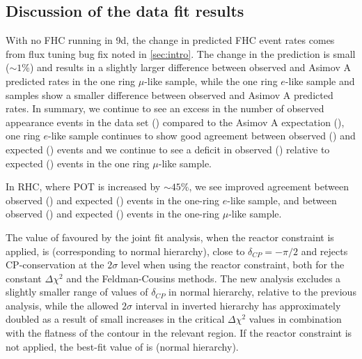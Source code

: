 \begin{table}[htb]
	\centering
	
	\caption{
		The confidence intervals at $1\sigma$, 90\%, $2\sigma$ and $3\sigma$ CL obtained with the Feldman-Cousins method for the \RunPeriod data set is shown for the measurement of \deltacp versus mass hierarchy.
	}
	\label{tab:fc_interval}
\end{table}

\FloatBarrier

\subsection {Discussion of the \RunPeriod data fit results}
\label{sec:results:discussion}

With no FHC running in 9d, the change in predicted FHC event rates comes from flux tuning bug fix noted in \ref{sec:intro}. The change in the prediction is small ($\sim1$\%) and results in a slightly larger difference between observed and Asimov A predicted rates in the one ring $\mu$-like sample, while the one ring $e$-like sample and \nueCConepi samples show a smaller difference between observed and Asimov A predicted rates. In summary, we continue to see an excess in the number of observed appearance events in the \nueCConepi data set (\NskObservedNueCConepi{})  compared to the Asimov A expectation (\NAsimovAExpectationNueCConepi{}), one ring $e$-like sample continues to show good agreement between observed (\NskObservedNue{}) and expected (\NAsimovAExpectationNue{}) events and we continue to see a deficit in observed (\NskObservedNumu{}) relative to expected (\NAsimovAExpectationNumu) events in the one ring $\mu$-like sample.

In RHC, where POT is increased by $\sim45$\%, we see improved agreement between observed (\NskObservedNueBar{}) and expected (\NAsimovAExpectationNueBar{}) events in the one-ring $e$-like sample, and between observed (\NskObservedNumuBar{}) and expected (\NAsimovAExpectationNumuBar) events in the one-ring $\mu$-like sample.

The value of \deltacp favoured by the joint fit analysis, when the reactor constraint is applied, is \BestFitDeltacpwRC (corresponding to normal hierarchy), close to $\delta_{CP} = -\pi / 2$ and rejects CP-conservation at the $2\sigma$ level when using the reactor constraint, both for the constant $\Delta\chi^2$ and the Feldman-Cousins methods. The new analysis excludes a slightly smaller range of values of $\delta_{CP}$ in normal hierarchy, relative to the previous analysis, while the allowed $2\sigma$ interval in inverted hierarchy has approximately doubled as a result of small increases in the critical $\Delta\chi^2$ values in combination with the flatness of the contour in the relevant region. If the reactor constraint is not applied, the best-fit value of \deltacp is \BestFitDeltacpwoRC (normal hierarchy).

